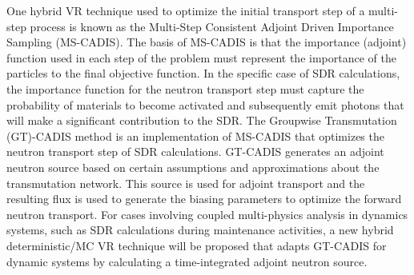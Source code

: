 One hybrid VR technique used to optimize the initial transport step of a
multi-step process is known as 
the Multi-Step Consistent Adjoint Driven Importance Sampling
(MS-CADIS). 
 The basis of MS-CADIS is that the importance (adjoint) function used
in each step of the problem must represent the importance of the particles to
the final objective function.  
In the specific case of SDR calculations, the importance function for the neutron transport step
must capture the probability of materials to become activated and subsequently emit photons that
will make a significant contribution to the SDR.
The Groupwise Transmutation (GT)-CADIS method 
is an implementation of MS-CADIS
that optimizes the neutron transport step of SDR calculations.
GT-CADIS generates an adjoint
neutron source based on certain assumptions and approximations about the
transmutation network.  
This source is used for adjoint transport and the resulting flux is used to
generate the biasing parameters to optimize the forward neutron transport.
For cases involving coupled multi-physics analysis in dynamics systems, such as SDR calculations
during maintenance activities,
a new hybrid deterministic/MC VR technique will be proposed that adapts 
GT-CADIS for dynamic systems by calculating a time-integrated adjoint
neutron source.



